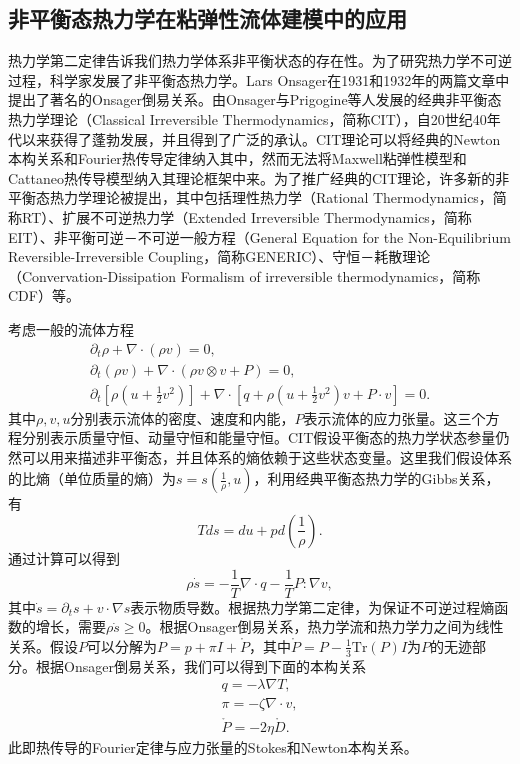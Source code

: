 \subsection{非平衡态热力学在粘弹性流体建模中的应用}
热力学第二定律告诉我们热力学体系非平衡状态的存在性。为了研究热力学不可逆过程，科学家发展了非平衡态热力学。Lars Onsager在1931和1932年的两篇文章中提出了著名的Onsager倒易关系\cite{onsager1931reciprocal,onsager1931reciprocalII}。由Onsager与Prigogine等人发展的经典非平衡态热力学理论（Classical Irreversible Thermodynamics，简称CIT），自20世纪40年代以来获得了蓬勃发展，并且得到了广泛的承认\cite{jou1996extended,truesdell2012rational}。CIT理论可以将经典的Newton本构关系和Fourier热传导定律纳入其中，然而无法将Maxwell粘弹性模型和Cattaneo热传导模型纳入其理论框架中来。为了推广经典的CIT理论，许多新的非平衡态热力学理论被提出，其中包括理性热力学（Rational Thermodynamics，简称RT）、扩展不可逆热力学（Extended Irreversible Thermodynamics，简称EIT）、非平衡可逆－不可逆一般方程（General Equation for the Non-Equilibrium Reversible-Irreversible Coupling，简称GENERIC）、守恒－耗散理论（Convervation-Dissipation Formalism of irreversible thermodynamics，简称CDF）等\cite{truesdell2012rational,jou1996extended,ottinger2005beyond,zhu2014conservation}。

考虑一般的流体方程
\begin{subequations} \label{eq:fluid}
	\begin{align}
		\partial_t \rho + \nabla \cdot (\rho v) = 0 ,\\
		\partial_t (\rho v) + \nabla \cdot (\rho v \otimes v + P) =  0, \\
		\partial_t[\rho (u + \frac{1}{2} v^2)] + \nabla \cdot [q + \rho (u+\frac{1}{2}v^2) v + P \cdot v] = 0.
	\end{align}
\end{subequations}
其中$\rho,v,u$分别表示流体的密度、速度和内能，$P$表示流体的应力张量。这三个方程分别表示质量守恒、动量守恒和能量守恒。CIT假设平衡态的热力学状态参量仍然可以用来描述非平衡态，并且体系的熵依赖于这些状态变量。这里我们假设体系的比熵（单位质量的熵）为$s=s(\frac{1}{\rho},u)$，利用经典平衡态热力学的Gibbs关系，有
\begin{equation*}
	T ds = du + p d(\frac{1}{\rho}).
\end{equation*}
通过计算可以得到
\begin{equation*}
	\rho \dot{s} = - \frac{1}{T} \nabla \cdot q - \frac{1}{T} P: \nabla v,
\end{equation*}
其中$\dot{s} = \partial_t s + v \cdot \nabla s$表示物质导数。根据热力学第二定律，为保证不可逆过程熵函数的增长，需要$\rho \dot{s} \ge 0 $。根据Onsager倒易关系，热力学流和热力学力之间为线性关系。假设$P$可以分解为$P = p + \pi I + \mathring{P}$，其中$\mathring{P} = P - \frac{1}{3} \mbox{Tr}(P) I$为$P$的无迹部分。根据Onsager倒易关系，我们可以得到下面的本构关系
\begin{eqnarray*}
	q = -\lambda \nabla T, \\
	\pi =  - \zeta \nabla \cdot v, \\
	\mathring{P} = - 2 \eta \mathring{D}.
\end{eqnarray*}
此即热传导的Fourier定律与应力张量的Stokes和Newton本构关系。

